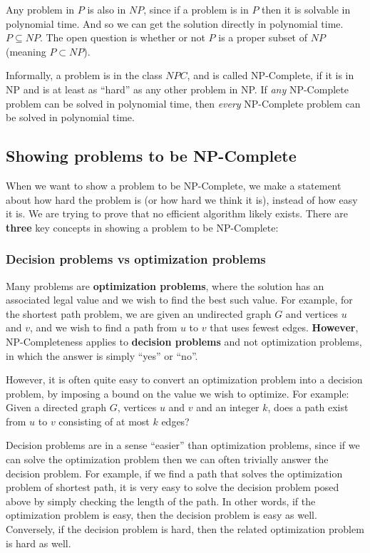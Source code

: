 Any problem in $P$ is also in $NP$, since if a problem is in $P$ then it is solvable in polynomial time. And so
we can get the solution directly in polynomial time. $P \subseteq NP$. The open question is whether or not $P$ is
a proper subset of $NP$ (meaning $P \subset NP$).

Informally, a problem is in the class $NPC$, and is called NP-Complete, if it is in NP and is at least as ``hard''
as any other problem in NP. If \textit{any} NP-Complete problem can be solved in polynomial time, then \textit{every}
NP-Complete problem can be solved in polynomial time.

\subsection{Showing problems to be NP-Complete}
When we want to show a problem to be NP-Complete, we make a statement about how hard the problem is (or how hard we
think it is), instead of how easy it is. We are trying to prove that no efficient algorithm likely exists. There are
\textbf{three} key concepts in showing a problem to be NP-Complete:
%
\subsubsection{Decision problems vs optimization problems}
Many problems are \textbf{optimization problems}, where the solution has an
associated legal value and we wish to find the best such value. For example,
for the shortest path problem, we are given an undirected graph $G$ and
vertices $u$ and $v$, and we wish to find a path from $u$ to $v$ that uses
fewest edges. \textbf{However}, NP-Completeness applies to \textbf{decision problems}
and not optimization problems, in which the answer is simply ``yes'' or ``no''.

However, it is often quite easy to convert an optimization problem into a decision problem, by
imposing a bound on the value we wish to optimize. For example: Given a directed graph $G$, vertices
$u$ and $v$ and an integer $k$, does a path exist from $u$ to $v$ consisting of at most $k$ edges?

Decision problems are in a sense ``easier'' than optimization problems, since if we can solve the optimization
problem then we can often trivially answer the decision problem. For example, if we find a path that solves the
optimization problem of shortest path, it is very easy to solve the decision problem posed above by simply checking
the length of the path. In other words, if the optimization problem is easy, then the decision problem is easy as well.
Conversely, if the decision problem is hard, then the related optimization problem is hard as well.

